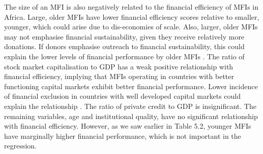 \documentclass[a4paper, nobind]{templates/ociamthesis}
\begin{document}
The size of an MFI is also negatively related to the financial efficiency of MFIs in Africa. Large, older MFIs have lower financial efficiency scores relative to smaller, younger, which could arise due to dis-economies of scale. Also, larger, older MFIs may not emphasise financial sustainability, given they receive relatively more donations. If donors emphasise outreach to financial sustainability, this could explain the lower levels of financial performance by older MFIs \autocite{d2013unsubsidized}. The ratio of stock market capitalisation to GDP has a weak positive relationship with financial efficiency, implying that MFIs operating in countries with better functioning capital markets exhibit better financial performance. Lower incidence of financial exclusion in countries with well developed capital markets could explain the relationship \autocite{allen2014african}. The ratio of private credit to GDP is insignificant. The remaining variables, age and institutional quality, have no significant relationship with financial efficiency. However, as we saw earlier in Table 5.2, younger MFIs have marginally higher financial performance, which is not important in the regression.

\newpage
\end{document}
